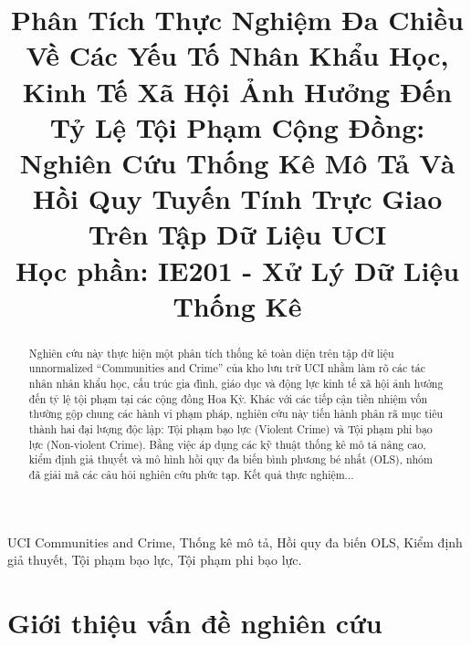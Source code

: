 \documentclass[conference]{IEEEtran}
\begin{document}
\title{Phân Tích Thực Nghiệm Đa Chiều Về Các Yếu Tố Nhân Khẩu Học, Kinh Tế Xã Hội Ảnh Hưởng Đến Tỷ Lệ Tội Phạm Cộng Đồng: Nghiên Cứu Thống Kê Mô Tả Và Hồi Quy Tuyến Tính Trực Giao Trên Tập Dữ Liệu UCI\\
\vspace{0.3cm}
\large Học phần: IE201 - Xử Lý Dữ Liệu Thống Kê}

\author{

\and
{}
}

\maketitle

\begin{abstract}
Nghiên cứu này thực hiện một phân tích thống kê toàn diện trên tập dữ liệu unnormalized ``Communities and Crime'' của kho lưu trữ UCI nhằm làm rõ các tác nhân nhân khẩu học, cấu trúc gia đình, giáo dục và động lực kinh tế xã hội ảnh hưởng đến tỷ lệ tội phạm tại các cộng đồng Hoa Kỳ. Khác với các tiếp cận tiền nhiệm vốn thường gộp chung các hành vi phạm pháp, nghiên cứu này tiến hành phân rã mục tiêu thành hai đại lượng độc lập: Tội phạm bạo lực (Violent Crime) và Tội phạm phi bạo lực (Non-violent Crime). Bằng việc áp dụng các kỹ thuật thống kê mô tả nâng cao, kiểm định giả thuyết và mô hình hồi quy đa biến bình phương bé nhất (OLS), nhóm đã giải mã các câu hỏi nghiên cứu phức tạp. Kết quả thực nghiệm...
\end{abstract}

\begin{IEEEkeywords}
UCI Communities and Crime, Thống kê mô tả, Hồi quy đa biến OLS, Kiểm định giả thuyết, Tội phạm bạo lực, Tội phạm phi bạo lực.
\end{IEEEkeywords}

\section{Giới thiệu vấn đề nghiên cứu}
\end{document}
